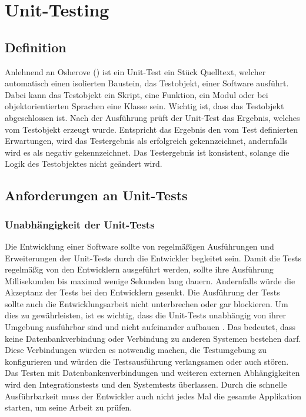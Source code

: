 \section{Unit-Testing}
\subsection{Definition}
Anlehnend an Osherove (\citeyear[S. 34]{Osherove2015}) ist ein Unit-Test ein Stück Quelltext, welcher automatisch einen isolierten Baustein, das Testobjekt, einer Software ausführt. Dabei kann das Testobjekt ein Skript, eine Funktion, ein Modul oder bei objektorientierten Sprachen eine Klasse sein. Wichtig ist, dass das Testobjekt abgeschlossen ist. Nach der Ausführung prüft der Unit-Test das Ergebnis, welches vom Testobjekt erzeugt wurde. Entspricht das Ergebnis den vom Test definierten Erwartungen, wird das Testergebnis als erfolgreich gekennzeichnet, andernfalls wird es als negativ gekennzeichnet.
Das Testergebnis ist konsistent, solange die Logik des Testobjektes nicht geändert wird.

\subsection{Anforderungen an Unit-Tests}
\subsubsection*{Unabhängigkeit der Unit-Tests}
Die Entwicklung einer Software sollte von regelmäßigen Ausführungen und Erweiterungen der Unit-Tests durch die Entwickler begleitet sein. Damit die Tests regelmäßig von den Entwicklern ausgeführt werden, sollte ihre Ausführung Millisekunden bis maximal wenige Sekunden lang dauern. Andernfalls würde die Akzeptanz der Tests bei den Entwicklern gesenkt. Die Ausführung der Tests sollte auch die Entwicklungsarbeit nicht unterbrechen oder gar blockieren. Um dies zu gewährleisten, ist es wichtig, dass die Unit-Tests unabhängig von ihrer Umgebung ausführbar sind und nicht aufeinander aufbauen \autocite[vgl.][S. 19]{Springer2015}. Das bedeutet, dass keine Datenbankverbindung oder Verbindung zu anderen Systemen bestehen darf. Diese Verbindungen würden es notwendig machen, die Testumgebung zu konfigurieren und würden die Testsausführung verlangsamen oder auch stören. Das Testen mit Datenbankenverbindungen und weiteren externen Abhängigkeiten wird den Integrationstests und den Systemtests überlassen.
Durch die schnelle Ausführbarkeit muss der Entwickler auch nicht jedes Mal die gesamte Applikation starten, um seine Arbeit zu prüfen.
